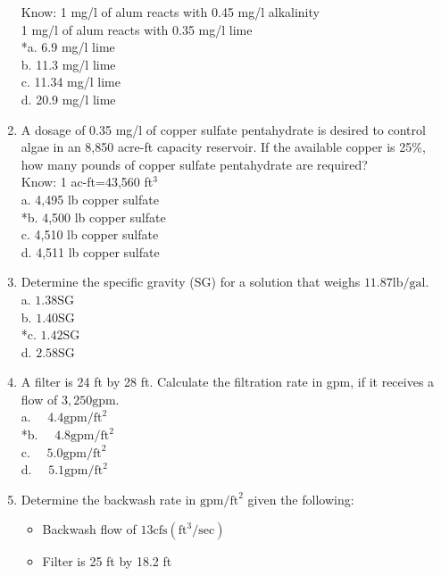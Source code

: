 \begin{enumerate}
\begin{itemize}
\end{itemize}
Know: 1 mg/l of alum reacts with 0.45 mg/l alkalinity\\
1 mg/l of alum reacts with 0.35 mg/l lime\\
*a. 6.9 mg/l lime\\
b. 11.3 mg/l lime\\
c. 11.34 mg/l lime\\
d. 20.9 mg/l lime\\
\item A dosage of 0.35 mg/l of copper sulfate pentahydrate is desired to control algae in an 8,850 acre-ft capacity reservoir. If the available copper is 25\%, how many pounds of copper sulfate pentahydrate are required?\\
Know: 1 ac-ft=43,560 ft$^{3}$\\
a. 4,495 lb copper sulfate\\
*b. 4,500 lb copper sulfate\\
c. 4,510 lb copper sulfate\\
d. 4,511 lb copper sulfate\\
\item Determine the specific gravity (SG) for a solution that weighs $11.87 \mathrm{lb} / \mathrm{gal}$.\\
a. $1.38 \mathrm{SG}$\\
b. $1.40 \mathrm{SG}$\\
*c. $1.42 \mathrm{SG}$\\
d. $2.58 \mathrm{SG}$\\
\item A filter is 24 ft by 28 ft. Calculate the filtration rate in gpm, if it receives a flow of $3,250 \mathrm{gpm}$.\\
a. $\quad 4.4 \mathrm{gpm} / \mathrm{ft}^{2}$\\
*b. $\quad 4.8 \mathrm{gpm} / \mathrm{ft}^{2}$\\
c. $\quad 5.0 \mathrm{gpm} / \mathrm{ft}^{2}$\\
d. $\quad 5.1 \mathrm{gpm} / \mathrm{ft}^{2}$\\
\item Determine the backwash rate in $\mathrm{gpm} / \mathrm{ft}^{2}$ given the following:\\
\begin{itemize}
\item Backwash flow of $13 \mathrm{cfs}\left(\mathrm{ft}^{3} / \mathrm{sec}\right)$\\
\item Filter is 25 ft by 18.2 ft\\

\end{itemize}
\end{enumerate}
